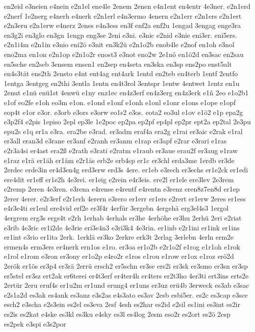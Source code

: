 {en2eid
e3neien
e4nein
e2n1el
ene4le
2enem
2enen
e4n1ent
en4entr
4e3ner.
e2n1erd
e2nerf
1e2nerg
e4nerh
e4nerk
e2n1erl
e4n3ermo
4enern
e2n1err
e2n1ers
e2n1ert
e2n3eru
e2n1erw
e4nerz
2enes
e4n3ess
en3f
enf2a
enf2u
1engad
3engag
enge3ra
en3g2i
en3glo
en3gn
1engp
eng3se
2eni
e3ni.
e3nic
e2nid
e3nie
eni3er.
eni5ers.
e2n1i4m
e2n1in
e3nio
eni2ö
e3nit
en3k2ü
e2n1o2b
enob4le
e2nof
en1oh
e3nol
eno2ma
en1on
e2n1op
e2n1o2r
enost3
e3not
eno2w
2e1nö
en1ö2d
en3sac
en2sau
en5sche
en2seb
3ensem
ensen1
en2sep
en4seta
en3ska
en3sp
ens2po
enst5alt
en4s3tät
ens2th
2ensto
e4nt
ent4ag
ent4ark
1entd
en2teb
en4terb
1entf
2entfo
1entga
3entgeg
en2thi
3entla
1entn
en4t3rol
3entspr
1entw
4entwet
1entz
en1u
2enut
e1nü
enü1st
4enwü
e1ny
enz1ec
en4z3erf
en4z3erg
en4z3erk
e1ñ
2eo
e1o2b1
e1of
eo2fe
e1oh
eo3m
e1on.
e1ond
e1onf
e1onh
e1onl
e1onr
e1ons
e1ope
e1opf
eop4t
e1or
e3or.
e3orb
e3ors
e3orw
eo1s2
e3os.
eota2
eo3ul
e1ov
e1ö2
e1p
epa2g
e3p2f4
e2pis
1episo
2epl
ep3le
1e2poc
ep2pa
ep2pf
ep4pl
ep2pr
ept2a
ep2tal
2e3pu
epu2s
e1q
er1a
e3ra.
era2be
e3rad.
er3adm
eraf4a
era2g
e1rai
er3aic
e2rak
e1ral
er3all
eran3d
e3rane
er3anf
e2ranh
er3anm
e1rap
er3apf
e2rar
e3rari
e1ras
e2r3a4si
er4ast
era2ß
e2rath
e3rati
e2ratm
e1raub
er3aue
erau2f
er3aug
e1raw
e1raz
e1rä
er1äh
er1äm
e2r1äs
erb2e
erb4sp
er1c
er3chl
erda3me
1erdb
er3de
2erdec
erde3in
er4d3en4g
erd3erw
erd3s
4ere.
er1eb
e3rech
er3echs
er1e2ck
er1edi
ere4dit
er1eff
er1e2h
4e3rei.
er1eig
e2rein
e4r3eis.
ere2l
er1ele
ere3lev
2e3rem
e2remp
2eren
4e3ren.
e3rena
e4rense
e4rentf
e4rentn
e3renz
eren8z7en8d
er1ep
2erer
4erer.
e2r3erf
e2r1erh
4erern
e3rero
er1err
er1ers
e2rert
er1erw
2eres
er1ess
e4r3e4ti
er1eul
ere4vid
erf2e
er3f4r
4erfür
3ergebn
4ergehä
erg3el4s3
1ergol
4ergrem
erg3s
ergs4t
e2rh
1erhab
4erhals
er3he
4erhöhe
er3hu
2erhü
2eri
e2riat
e3rib
4e3ric
er1i2de
4e3rie
eri3e4n3
e3ri3k4
4e3rin.
er1inb
e2r1ini
er1ink
er1ins
er1int
e3rio
er1ita
2erk.
1erklä
er3ko
2erkre
erk3t
2erlag
3erlebn
4erln
erm2e
ermen4s
erm3ers
er4nerk
ern1os
e1ro.
er3oa
er1o2b
e2r1o2f
e1rog
e1r1oh
e1rok
e1rol
e1rom
e3ron
er3ony
er1o2p
e4ro2r
e1ros
e1rou
e1row
er1ox
e1roz
erö2d
2erök
er1ös
er3p4
er3rä
2errü
ersch2
er5schn
er3se
ers2i
er3sk
er3smo
er3sn
er3sp
er5stel
er3sz
ert2ak
er6terei
er4t3erf
er4ter4h
er4ters
er2t3ho
4er3ti
ert3ins
erts2e
2ertür
2eru
eruf4s
er1u2m
er1und
erung4
er1uns
er3uz
erü4b
3erweck
es3ab
e3sac
e2s1a2d
es3ak
es4ank
es3anz
e3s2as
e4s3ato
es3av
2esb
esbi5er.
es2c
es3cap
e3sce
esch2
e3scha
e2s3ein
es2el
es3eva
2esf
4esh
es2har
es2id
e2sil
es1ini
es3int
es2ir
es2is
es2kat
e4ske
es3kl
es3ku
e4sky
es3l
es4log
2esm
eso2r
es2ort
es2ö
2esp
es2pek
e3spi
e3s2por
}
